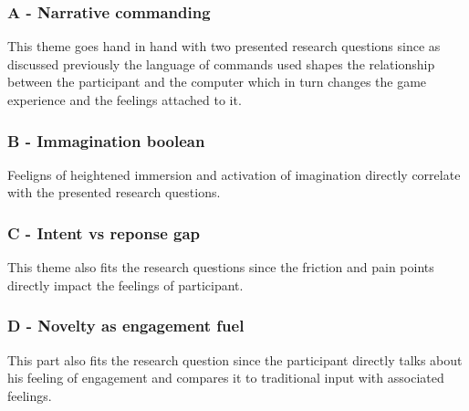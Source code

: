 \subsubsection{A - Narrative commanding}

This theme goes hand in hand with two presented research questions since as discussed previously the language of commands used shapes the relationship between the participant and the computer which in turn changes the game experience and the feelings attached to it.


\subsubsection{B - Immagination boolean}


Feeligns of heightened immersion and activation of imagination directly correlate with the presented research questions. 

\subsubsection{C - Intent vs reponse gap}


This theme also fits the research questions since the friction and pain points directly impact the feelings of participant.

\subsubsection{D - Novelty as engagement fuel}


This part also fits the research question since the participant directly talks about his feeling of engagement and compares it to traditional input with associated feelings.


